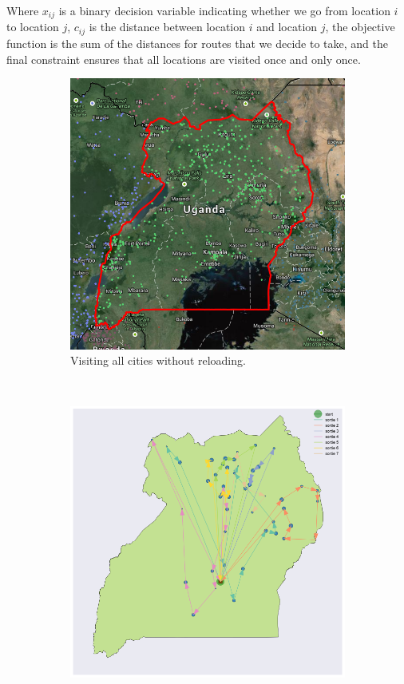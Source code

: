 \documentclass[a0,final]{a0poster}
\begin{document}
\begin{multicols}{3}
\noindent Where $x_{ij}$ is a binary decision variable indicating whether we go from location $i$ to location $j$, $c_{ij}$ is the distance between location $i$ and location $j$, the objective function is the sum of the distances for routes that we decide to take, and the final constraint ensures that all locations are visited once and only once.


\begin{figure}[H]
  \centering
  \begin{subfigure}[b]{0.49\columnwidth}
    \centering
    \includegraphics[width=\textwidth]{../write-up/figures/uganda}
    \caption{Visiting all cities without reloading.}
    \label{fig:a1}
  \end{subfigure}~\begin{subfigure}[b]{0.5\columnwidth}
    \centering
    \includegraphics[width=\textwidth]{../write-up/figures/routing-reloading}

\end{subfigure}
\end{figure}
\end{multicols}
\end{document}
